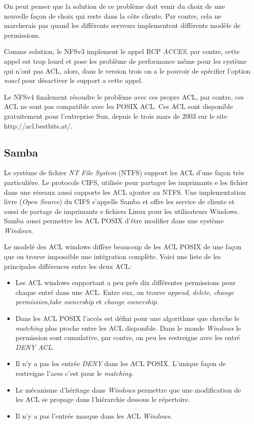 \documentclass{article}
\begin{document}
On peut penser que la solution de ce problème doit venir du choix de une nouvelle façon de choix qui reste dans la côte cliente. Par contre, cela ne marcherais pas quand les différents serveurs implementent différents modèle de permissions. 

Comme solution, le NFSv3 implement le appel RCP \emph{ACCES}, par contre, cette appel est trop lourd et pose les problème de performance même pour les système qui n'ont pas ACL, alors, dans le version trois on a le pouvoir de spécifier l'option \emph{noacl} pour désactiver le support a cette appel. 

Le NFSv4 finalement résoudre le problème avec ces propre ACL, par contre, ces ACL ne sont pas compatible avec les POSIX ACL. Ces ACL sont disponible gratuitement pour l'entreprise Sun, depuis le trois mars de 2003 sur le site http://acl.bestbits.at/. 

\subsection{Samba}
Le système de fichier \emph{NT File System} (NTFS) support les ACL d'une façon très particulière. Le protocole CIFS\cite{cifs}, utilisée pour partager les imprimants e les fichier dans une réseaux aussi supporte les ACL ajouter au NTFS. Une implementation livre (\emph{Open Source}) du CIFS s'appelle Samba et offre les service de cliente et aussi de partage de imprimants e fichiers Linux pour les utilisateurs Windows. Samba aussi permettre les ACL POSIX d'être modifier dans une système \emph{Windows}.  

Le modelé des ACL windows diffère beaucoup de les ACL POSIX de une façon que on trouve impossible une intégration complète. Voici une liste de les principales différences entre les deux ACL:

\begin{itemize}
	\item Les ACL windows supportant a peu prés dix différentes permissions pour chaque entré dans une ACL. Entre eux, on trouve \emph{append}, \emph{delete}, \emph{change permission},\emph{take ownership} et \emph{change ownership}.
	\item Dans les ACL POSIX l'accès est défini pour une algorithme que cherche le \emph{matching} plus proche entre les ACL disponible. Dans le monde \emph{Windows} le permission sont cumulative, par contre, on peu les restreigne avec les entré \emph{DENY ACL}.
	\item Il n'y a pas les entrée \emph{DENY} dans les ACL POSIX. L'unique façon de restreigne l'aces c'est pour le \emph{matching}.
	\item Le mécanisme d'héritage dans \emph{Windows} permettre que une modification de les ACL se propage dans l'hiérarchie dessous le répertoire.
	\item Il n'y a pas l'entrée masque dans les ACL \emph{Windows}.
\end{itemize}
\end{document}
